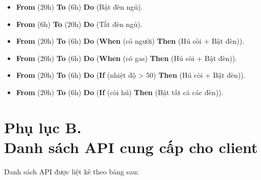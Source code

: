 \documentclass[12pt,a4paper,oneside]{extbook}
\begin{document}
\begin{itemize}[topsep=1mm,itemsep=-0.5mm]
\item \textbf{From} (20h) \textbf{To} (6h) \textbf{Do} (Bật đèn ngủ).
\item \textbf{From} (6h) \textbf{To} (20h) \textbf{Do} (Tắt đèn ngủ).
\item \textbf{From} (20h) \textbf{To} (6h) \textbf{Do} (\textbf{When} (có người) \textbf{Then} (Hú còi + Bật đèn)).
\item \textbf{From} (20h) \textbf{To} (6h) \textbf{Do} (\textbf{When} (có gas) \textbf{Then} (Hú còi + Bật đèn)).
\item \textbf{From} (20h) \textbf{To} (6h) \textbf{Do} (\textbf{If} (nhiệt độ > 50) \textbf{Then} (Hú còi + Bật đèn)).
\item \textbf{From} (20h) \textbf{To} (6h) \textbf{Do} (\textbf{If} (còi hú) \textbf{Then} (Bật tất cả các đèn)).
\vspace{1mm}
\end{itemize}

\thispagestyle{plain}

\chapter*{Phụ lục B. \\Danh sách API cung cấp cho client}

Danh sách API được liệt kê theo bảng sau:
\end{document}
